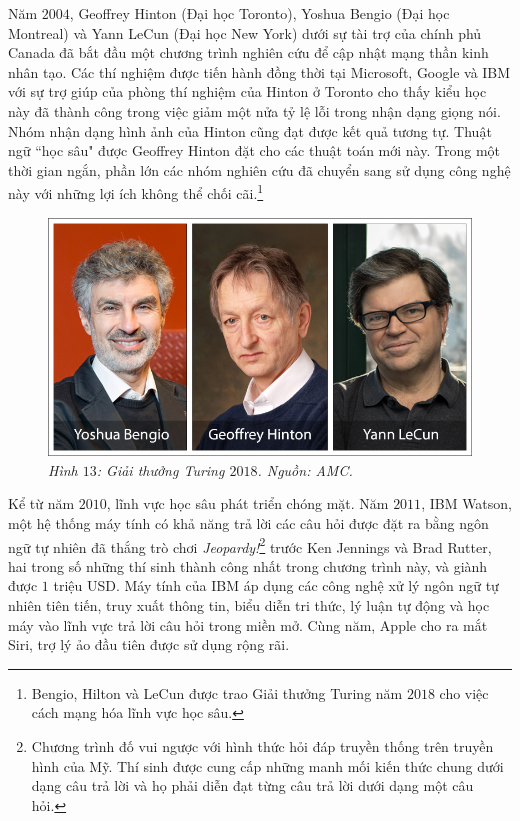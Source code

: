 \begin{multicols}{2}
\begin{figure}[H]
		\vspace*{-10pt}
	\end{figure}
	Năm $2004$, Geoffrey Hinton (Đại học Toronto), Yoshua Bengio (Đại học Montreal) và Yann LeCun (Đại học New York) dưới sự tài trợ của chính phủ Canada đã bắt đầu một chương trình nghiên cứu để cập nhật mạng thần kinh nhân tạo. Các thí nghiệm được tiến hành đồng thời tại Microsoft, Google và IBM với sự trợ giúp của phòng thí nghiệm của Hinton  ở Toronto cho thấy kiểu học này đã thành công trong việc giảm một nửa tỷ lệ lỗi trong nhận dạng giọng nói. Nhóm nhận dạng hình ảnh của Hinton cũng đạt được kết quả tương tự. Thuật ngữ ``học sâu" được Geoffrey Hinton đặt cho các thuật toán mới này. Trong một thời gian ngắn, phần lớn các nhóm nghiên cứu đã chuyển sang sử dụng công nghệ này với những lợi ích không thể chối cãi.\footnote{\color{timhieukhoahoc}Bengio, Hilton và LeCun được trao Giải thưởng Turing năm $2018$ cho việc cách mạng hóa lĩnh vực học sâu.} 
	\begin{figure}[H]
		\vspace*{5pt}
		\centering
		\captionsetup{labelformat= empty, justification=centering}
		\includegraphics[width= 1\linewidth]{turing-2018-bengio-hinton-lecun.jpg}
		\caption{\small\textit{\color{timhieukhoahoc}Hình $13$: Giải thưởng Turing $2018$. Nguồn: AMC.}}
		\vspace*{-15pt}
	\end{figure}
	Kể từ năm $2010$, lĩnh vực học sâu phát triển chóng mặt. 
	\vskip 0.1cm
	Năm $2011$, IBM Watson, một hệ thống máy tính có khả năng trả lời các câu hỏi được đặt ra bằng ngôn ngữ tự nhiên đã thắng trò chơi \textit{Jeopardy!}\footnote{\color{timhieukhoahoc}Chương trình đố vui ngược với hình thức hỏi đáp truyền thống trên truyền hình của Mỹ. Thí sinh được cung cấp những manh mối kiến thức chung dưới dạng câu trả lời và họ phải diễn đạt từng câu trả lời dưới dạng một câu hỏi.} trước Ken Jennings và Brad Rutter, hai trong số những thí sinh thành công nhất trong chương trình này, và giành được $1$ triệu USD. Máy tính của IBM áp dụng các công nghệ xử lý ngôn ngữ tự nhiên tiên tiến, truy xuất thông tin, biểu diễn tri thức, lý luận tự động và học máy vào lĩnh vực trả lời câu hỏi trong miền mở. Cùng năm, Apple cho ra mắt Siri, trợ lý ảo đầu tiên được sử dụng rộng rãi.

\end{multicols}
